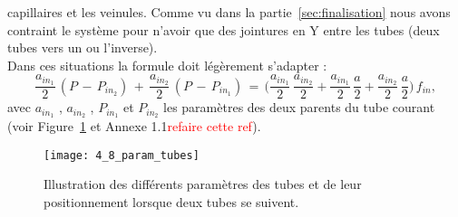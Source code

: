 capillaires et les veinules. Comme vu dans la partie~\ref{sec:finalisation} nous avons contraint le système pour n’avoir
que des jointures en Y entre les tubes (deux tubes vers un ou l’inverse).\\
Dans ces situations la formule doit légèrement s’adapter :
\begin{equation}
\frac{a_{in_1}}{2}\,(P\,-\,P_{in_2})\,+\,\frac{a_{in_2}}{2}\,(P\,-\,P_{in_1})\,=\,\biggl(\frac{a_{in_1}}{2}\,\frac{a_{in_2}}{2}+\frac{a_{in_1}}{2}\,\frac{a}{2}+\frac{a_{in_2}}{2}\,\frac{a}{2}\biggr)\,f_{in},
\end{equation}
avec $a_{in_1}$ , $a_{in_2}$ , $P_{in_1}$ et $P_{in_2}$ les paramètres des deux parents du tube courant (voir Figure~\ref{fig:4_8_param_tubes} et Annexe
1.1\textcolor{red}{refaire cette ref}).\\
\begin{figure}[!t]
\centering
\texttt{[image: 4\_8\_param\_tubes]}
\caption{Illustration des différents paramètres des tubes et de leur positionnement lorsque deux tubes se suivent.}
\label{fig:4_8_param_tubes}	
\end{figure}


